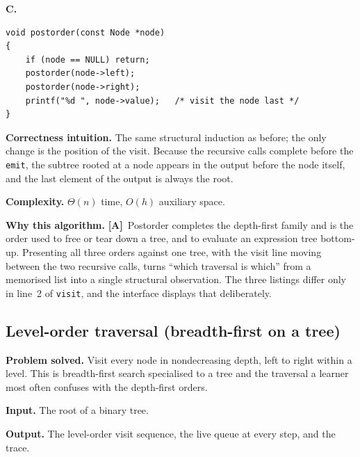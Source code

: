 \documentclass[11pt,a4paper]{article}
\newcommand{\A}{\textcolor{asmc}{\textbf{[A]}}}     %
\newcommand{\ct}[1]{\texttt{#1}}
\begin{document}
\smallskip
\noindent\textbf{C.}
\begin{lstlisting}[style=c,caption={Postorder traversal in C.},label={lst:c-postorder}]
void postorder(const Node *node)
{
    if (node == NULL) return;
    postorder(node->left);
    postorder(node->right);
    printf("%d ", node->value);   /* visit the node last */
}
\end{lstlisting}

\noindent\textbf{Correctness intuition.} The same structural induction as before; the only change
is the position of the visit. Because the recursive calls complete before the \ct{emit}, the
subtree rooted at a node appears in the output before the node itself, and the last element of
the output is always the root.

\smallskip
\noindent\textbf{Complexity.} $\Theta(n)$ time, $O(h)$ auxiliary space.

\smallskip
\noindent\textbf{Why this algorithm.} \A\ Postorder completes the depth-first family and is the
order used to free or tear down a tree, and to evaluate an expression tree bottom-up. Presenting
all three orders against one tree, with the visit line moving between the two recursive calls,
turns ``which traversal is which'' from a memorised list into a single structural observation.
The three listings differ only in line~2 of \ct{visit}, and the interface displays that
deliberately.

\subsection{Level-order traversal (breadth-first on a tree)}

\noindent\textbf{Problem solved.} Visit every node in nondecreasing depth, left to right within a
level. This is breadth-first search specialised to a tree and the traversal a learner most often
confuses with the depth-first orders.

\smallskip
\noindent\textbf{Input.} The root of a binary tree.

\smallskip
\noindent\textbf{Output.} The level-order visit sequence, the live queue at every step, and the
trace.
\end{document}
